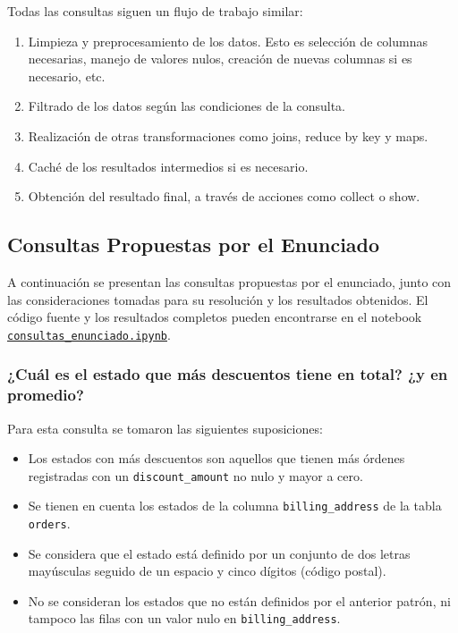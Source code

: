 Todas las consultas siguen un flujo de trabajo similar:
\begin{enumerate}
    \item Limpieza y preprocesamiento de los datos. Esto es selección de columnas necesarias, manejo de valores nulos, creación de nuevas columnas si es necesario, etc.
    \item Filtrado de los datos según las condiciones de la consulta.
    \item Realización de otras transformaciones como joins, reduce by key y maps.
    \item Caché de los resultados intermedios si es necesario.
    \item Obtención del resultado final, a través de acciones como collect o show.
\end{enumerate}

\subsection{Consultas Propuestas por el Enunciado}

A continuación se presentan las consultas propuestas por el enunciado, junto con las consideraciones tomadas para su resolución y los resultados obtenidos. El código fuente y los resultados completos pueden encontrarse en el notebook \href{https://github.com/patricioibar/datos-tp2/blob/main/consultas_enunciado.ipynb}{\texttt{consultas\_enunciado.ipynb}}.

\subsubsection{¿Cuál es el estado que más descuentos tiene en total? ¿y en promedio?}

Para esta consulta se tomaron las siguientes suposiciones:
\begin{itemize}
    \item Los estados con más descuentos son aquellos que tienen más órdenes registradas con un \texttt{discount\_amount} no nulo y mayor a cero.
    \item Se tienen en cuenta los estados de la columna \texttt{billing\_address} de la tabla \texttt{orders}.
    \item Se considera que el estado está definido por un conjunto de dos letras mayúsculas seguido de un espacio y cinco dígitos (código postal).
    \item No se consideran los estados que no están definidos por el anterior patrón, ni tampoco las filas con un valor nulo en \texttt{billing\_address}.
\end{itemize}

